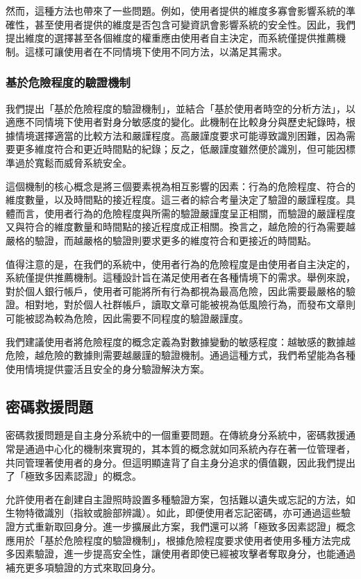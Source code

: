 然而，這種方法也帶來了一些問題。例如，使用者提供的維度多寡會影響系統的準確性，甚至使用者提供的維度是否包含可變資訊會影響系統的安全性。因此，我們提出維度的選擇甚至各個維度的權重應由使用者自主決定，而系統僅提供推薦機制。這樣可讓使用者在不同情境下使用不同方法，以滿足其需求。
\subsubsection{基於危險程度的驗證機制}
我們提出「基於危險程度的驗證機制」，並結合「基於使用者時空的分析方法」，以適應不同情境下使用者對身分敏感度的變化。此機制在比較身分與歷史紀錄時，根據情境選擇適當的比較方法和嚴謹程度。高嚴謹度要求可能導致識別困難，因為需要更多維度符合和更近時間點的紀錄；反之，低嚴謹度雖然便於識別，但可能因標準過於寬鬆而威脅系統安全。

這個機制的核心概念是將三個要素視為相互影響的因素：行為的危險程度、符合的維度數量，以及時間點的接近程度。這三者的綜合考量決定了驗證的嚴謹程度。具體而言，使用者行為的危險程度與所需的驗證嚴謹度呈正相關，而驗證的嚴謹程度又與符合的維度數量和時間點的接近程度成正相關。換言之，越危險的行為需要越嚴格的驗證，而越嚴格的驗證則要求更多的維度符合和更接近的時間點。

值得注意的是，在我們的系統中，使用者行為的危險程度是由使用者自主決定的，系統僅提供推薦機制。這種設計旨在滿足使用者在各種情境下的需求。舉例來說，對於個人銀行帳戶，使用者可能將所有行為都視為最高危險，因此需要最嚴格的驗證。相對地，對於個人社群帳戶，讀取文章可能被視為低風險行為，而發布文章則可能被認為較為危險，因此需要不同程度的驗證嚴謹度。

我們建議使用者將危險程度的概念定義為對數據變動的敏感程度：越敏感的數據越危險，越危險的數據則需要越嚴謹的驗證機制。通過這種方式，我們希望能為各種使用情境提供靈活且安全的身分驗證解決方案。
\subsection{密碼救援問題}
密碼救援問題是自主身分系統中的一個重要問題。在傳統身分系統中，密碼救援通常是通過中心化的機制來實現的，其本質的概念就如同系統內存在著一位管理者，共同管理著使用者的身分。但這明顯違背了自主身分追求的價值觀，因此我們提出了「極致多因素認證」的概念。

允許使用者在創建自主證照時設置多種驗證方案，包括難以遺失或忘記的方法，如生物特徵識別（指紋或臉部辨識）。如此，即便使用者忘記密碼，亦可通過這些驗證方式重新取回身分。進一步擴展此方案，我們還可以將「極致多因素認證」概念應用於「基於危險程度的驗證機制」，根據危險程度要求使用者使用多種方法完成多因素驗證，進一步提高安全性，讓使用者即使已經被攻擊者奪取身分，也能通過補充更多項驗證的方式來取回身分。

